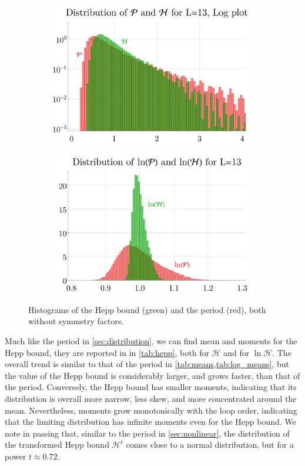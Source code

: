 \documentclass[11pt,a4paper]{article}
\renewcommand{\|}{\rule[-0.4ex]{0.2ex}{1.2em}}
\begin{document}
\begin{figure}[htbp]
	\begin{subfigure}[b]{.48 \textwidth}
		\includegraphics[width=\linewidth]{distribution_H_13_log}
	\end{subfigure}
	\begin{subfigure}[b]{.48 \textwidth}
		\includegraphics[width=\linewidth]{distribution_logH_13}
	\end{subfigure}
	
	\caption{Histograms of the Hepp bound (green) and the period (red), both without symmetry factors. }
	\label{histograms_H}
\end{figure}

Much like the period in \cref{sec:distribution}, we can find mean and moments  for the Hepp bound, they are reported in in \cref{tab:hepp}, both for $\mathcal H$ and for $\ln \mathcal H$. The overall trend is similar to that of the period in \cref{tab:means,tab:log_means}, but the value of the Hepp bound is considerably larger, and grows faster, than that of the period. Conversely, the Hepp bound has smaller moments, indicating that its distribution is overall more narrow, less skew, and more concentrated around the mean. Nevertheless, moments grow monotonically with the loop order, indicating that the limiting distribution has infinite moments even for the Hepp bound. 
We  note in passing that, similar to the period in \cref{sec:nonlinear}, the distribution of the transformed Hepp bound $\mathcal H^t$ comes close to a normal distribution, but for a power $t \approx 0.72$.  
\end{document}
